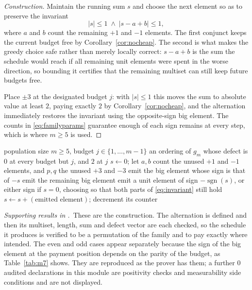 \begin{proof}[Construction]
Maintain the running sum $s$ and choose the next element so as to preserve the invariant
\begin{equation}
|s|\le1 \;\wedge\; |s-a+b|\le1,
\label{eq:invariant}
\end{equation}
where $a$ and $b$ count the remaining $+1$ and $-1$ elements. The first conjunct keeps the
current budget free by Corollary~\ref{cor:nocheap}. The second is what makes the greedy
choice safe rather than merely locally correct: $s-a+b$ is the sum the schedule would reach
if all remaining unit elements were spent in the worse direction, so bounding it certifies
that the remaining multiset can still keep future budgets free.

Place $\pm3$ at the designated budget $j$: with $|s|\le1$ this moves the sum to absolute
value at least $2$, paying exactly $2$ by Corollary~\ref{cor:nocheap}, and the alternation
immediately restores the invariant using the opposite-sign big element. The counts in
\eqref{eq:familyparams} guarantee enough of each sign remains at every step, which is where
$m\ge5$ is used.
\end{proof}

\begin{algorithm}[htbp]
\caption{One-defect schedule for a designated budget $j$}
\label{alg:menu}
\begin{algorithmic}[1]
\REQUIRE population size $m\ge5$, budget $j\in\{1,\dots,m-1\}$
\ENSURE an ordering of $g_{m}$ whose defect is $0$ at every budget but $j$, and $2$ at $j$
\STATE $s\leftarrow0$; let $a,b$ count the unused $+1$ and $-1$ elements, and
       $p,q$ the unused $+3$ and $-3$
    \STATE emit the big element whose sign is that of $-s$ 
    \STATE emit the remaining big element 
  \ELSE
    \STATE emit a unit element of sign $-\operatorname{sgn}(s)$, or either sign if $s=0$,
           choosing so that both parts of \eqref{eq:invariant} still hold
  \ENDIF
  \STATE $s\leftarrow s+(\text{emitted element})$; decrement its counter
\ENDFOR
\end{algorithmic}
\end{algorithm}


\noindent\emph{Supporting results in .}~These are the construction. The alternation is defined and then its multiset, length, sum and defect vector are each checked, so the schedule it produces is verified to be a permutation of the family and to pay exactly where intended. The even and odd cases appear separately because the sign of the big element at the payment position depends on the parity of the budget, as Table~\ref{tab:m7} shows. They are reproduced as the prover has them; a further $0$ audited declarations in this module are positivity checks and measurability side conditions and are not displayed.

